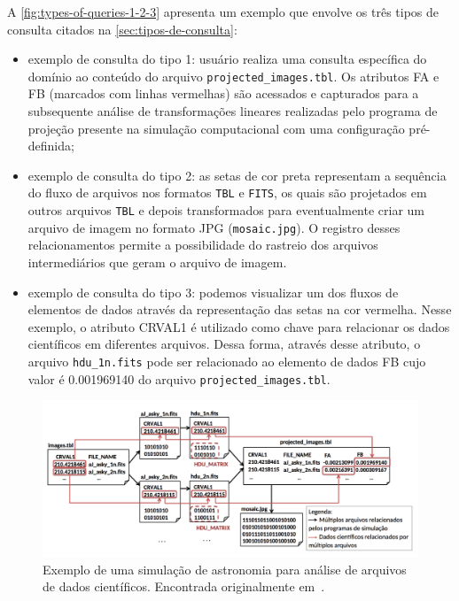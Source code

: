 A \autoref{fig:types-of-queries-1-2-3} apresenta um exemplo que envolve os três tipos de consulta citados na \autoref{sec:tipos-de-consulta}:

\begin{itemize}
    \item exemplo de consulta do tipo 1: usuário realiza uma consulta específica do domínio ao conteúdo do arquivo \mbox{\texttt{projected{\_}images.tbl}}. Os atributos FA e FB (marcados com linhas vermelhas) são acessados e capturados para a subsequente análise de transformações lineares realizadas pelo programa de projeção presente na simulação computacional com uma configuração pré-definida;
    \item exemplo de consulta do tipo 2: as setas de cor preta representam a sequência do fluxo de arquivos nos formatos \texttt{TBL} e \texttt{FITS}, os quais são projetados em outros arquivos \texttt{TBL} e depois transformados para eventualmente criar um arquivo de imagem no formato JPG (\mbox{\texttt{mosaic.jpg}}). O registro desses relacionamentos permite a possibilidade do rastreio dos arquivos intermediários que geram o arquivo de imagem.
    \item exemplo de consulta do tipo 3: podemos visualizar um dos fluxos de elementos de dados através da representação das setas na cor vermelha. Nesse exemplo, o atributo CRVAL1 é utilizado como chave para relacionar os dados científicos em diferentes arquivos. Dessa forma, através desse atributo, o arquivo \mbox{\texttt{hdu{\_}1n.fits}} pode ser relacionado ao elemento de dados FB cujo valor é 0.001969140 do arquivo \mbox{\texttt{projected{\_}images.tbl}}.
\end{itemize}

\begin{figure}[ht]
    \centering
    \includegraphics[width=\textwidth]{img/types-of-queries-1-2-3}
    \caption[Exemplo de análise de uma simulação de astronomia]{Exemplo de uma simulação de astronomia para análise de arquivos de dados científicos. Encontrada originalmente em~\cite{silva2015propostadoutorado}.}%
    \label{fig:types-of-queries-1-2-3}
\end{figure}

